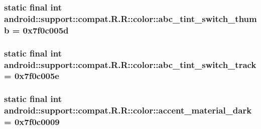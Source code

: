 \hypertarget{classandroid_1_1support_1_1compat_1_1_r_1_1color_92af11108ea8e08b73d1d18236da26d0}{
\subsubsection[{abc\_\-tint\_\-switch\_\-thumb}]{\setlength{\rightskip}{0pt plus 5cm}static final int android::support::compat.R.R::color::abc\_\-tint\_\-switch\_\-thumb = 0x7f0c005d}}
\label{classandroid_1_1support_1_1compat_1_1_r_1_1color_92af11108ea8e08b73d1d18236da26d0}


\hypertarget{classandroid_1_1support_1_1compat_1_1_r_1_1color_daa2624bee383727dfce1c300d36b0a0}{
\subsubsection[{abc\_\-tint\_\-switch\_\-track}]{\setlength{\rightskip}{0pt plus 5cm}static final int android::support::compat.R.R::color::abc\_\-tint\_\-switch\_\-track = 0x7f0c005e}}
\label{classandroid_1_1support_1_1compat_1_1_r_1_1color_daa2624bee383727dfce1c300d36b0a0}


\hypertarget{classandroid_1_1support_1_1compat_1_1_r_1_1color_ea8dc0c2faf865d33f840d57ee740f17}{
\subsubsection[{accent\_\-material\_\-dark}]{\setlength{\rightskip}{0pt plus 5cm}static final int android::support::compat.R.R::color::accent\_\-material\_\-dark = 0x7f0c0009}}
\label{classandroid_1_1support_1_1compat_1_1_r_1_1color_ea8dc0c2faf865d33f840d57ee740f17}


